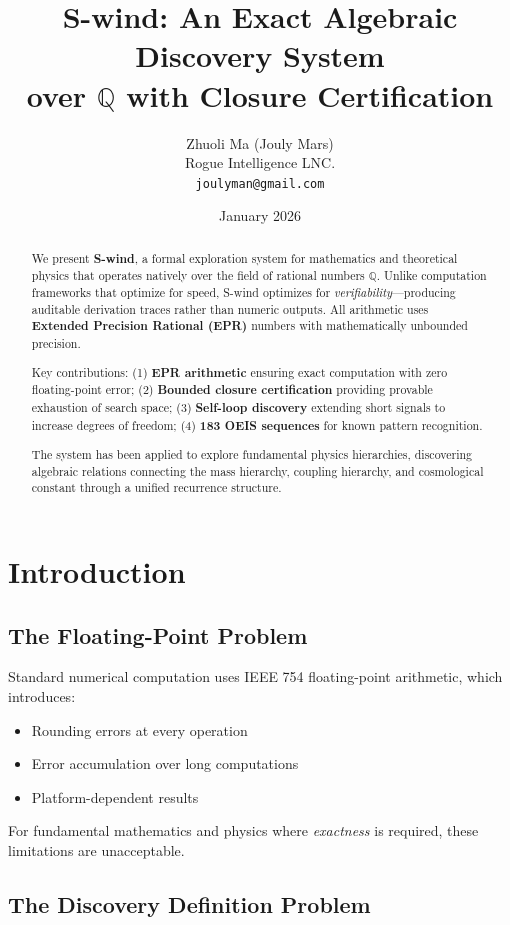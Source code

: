 \documentclass[11pt,a4paper]{article}
\title{\textbf{S-wind: An Exact Algebraic Discovery System\\over $\mathbb{Q}$ with Closure Certification}}
\author{Zhuoli Ma (Jouly Mars)\\
\small Rogue Intelligence LNC.\\
\small \texttt{joulyman@gmail.com}}
\date{January 2026}
\begin{document}
\maketitle

\begin{abstract}
We present \textbf{S-wind}, a formal exploration system for mathematics and 
theoretical physics that operates natively over the field of rational numbers 
$\mathbb{Q}$. Unlike computation frameworks that optimize for speed, S-wind 
optimizes for \emph{verifiability}---producing auditable derivation traces 
rather than numeric outputs. All arithmetic uses \textbf{Extended Precision 
Rational (EPR)} numbers with mathematically unbounded precision.

Key contributions: (1) \textbf{EPR arithmetic} ensuring exact computation 
with zero floating-point error; (2) \textbf{Bounded closure certification} 
providing provable exhaustion of search space; (3) \textbf{Self-loop discovery} 
extending short signals to increase degrees of freedom; (4) \textbf{183 OEIS 
sequences} for known pattern recognition.

The system has been applied to explore fundamental physics hierarchies, 
discovering algebraic relations connecting the mass hierarchy, coupling 
hierarchy, and cosmological constant through a unified recurrence structure.
\end{abstract}

\section{Introduction}

\subsection{The Floating-Point Problem}

Standard numerical computation uses IEEE 754 floating-point arithmetic, which 
introduces:
\begin{itemize}
    \item Rounding errors at every operation
    \item Error accumulation over long computations
    \item Platform-dependent results
\end{itemize}

For fundamental mathematics and physics where \emph{exactness} is required, 
these limitations are unacceptable.

\subsection{The Discovery Definition Problem}
\end{document}
